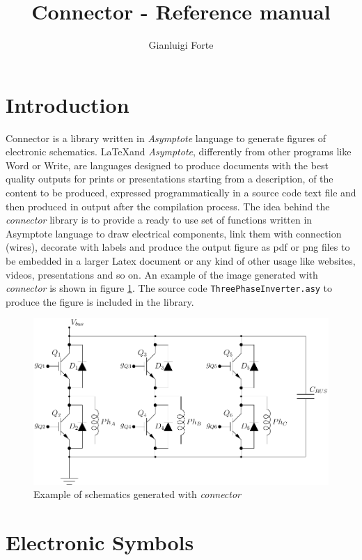 \documentclass[a4paper,12pt]{report}
\title{Connector - Reference manual }
\author{Gianluigi Forte}
\begin{document}
\maketitle

\section*{Introduction}

Connector is a library written in \emph{Asymptote} language to generate figures of electronic schematics.
\LaTeX and \emph{Asymptote}, differently from other programs like Word or Write, are languages designed
to produce documents with the best quality outputs for prints or presentations starting from a description,
of the content to be produced, expressed programmatically in a source code text file and then produced in
output after the compilation process. The idea behind the \emph{connector} library is to provide a ready
to use set of functions written in Asymptote language to draw electrical components, link them with connection
(wires), decorate with labels and produce the output figure as pdf or png files to be embedded in a larger
Latex document or any kind of other usage like websites, videos, presentations and so on. 
An example of the image generated with \emph{connector} is shown in figure \ref{threePhaseInverterExample}.
The source code \texttt{ThreePhaseInverter.asy} to produce the figure is included in the library.

\begin{figure}[ht]
  \centering
  \includegraphics[width=1.0\textwidth]{ThreePhaseInverter.pdf}
  \caption{Example of schematics generated with \emph{connector}}
  \label{threePhaseInverterExample}
\end{figure}

\section*{Electronic Symbols}
\end{document}
